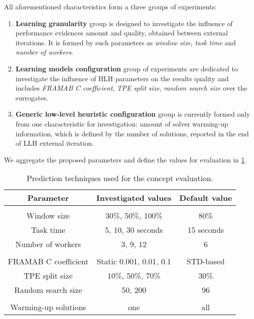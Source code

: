 All aforementioned characteristics form a three groups of experiments:
\begin{enumerate}
	\item \textbf{Learning granularity} group is designed to investigate the influence of performance evidences amount and quality, obtained between external iterations. It is formed by such parameters as \emph{window size}, \emph{task time} and \emph{number of workers}.
	
	\item \textbf{Learning models configuration} group of experiments are dedicated to investigate the influence of HLH parameters on the results quality and includes \emph{FRAMAB C coefficient}, \emph{TPE split size}, \emph{random search size} over the surrogates.
	
	\item \textbf{Generic low-level heuristic configuration} group is currently formed only from one characteristic for investigation: amount of solver warming-up information, which is defined by the number of solutions, reported in the end of LLH external iteration.
\end{enumerate}

We aggregate the proposed parameters and define the values for evaluation in \cref{eval:2: planning table}.

\begin{table}[h!]
	\centering
	\begin{tabular}{ccc}
		\hline
		\textbf{Parameter} & \textbf{Investigated values} & \textbf{Default value} \\
		\hline
		\rowcolor{gray!10}
		\multicolumn{3}{c}{\textit{Learning granularity}} \\
		Window size & 30\%, 50\%, 100\% & 80\% \\
		Task time & 5, 10, 30 seconds & 15 seconds \\
		Number of workers & 3, 9, 12 & 6 \\
		\rowcolor{gray!10}
		\multicolumn{3}{c}{\textit{Learning models configuration}} \\
		FRAMAB C coefficient & Static 0.001, 0.01, 0.1 & STD-based \\
		TPE split size & 10\%, 50\%, 70\% & 30\% \\
		Random search size & 50, 200 & 96 \\
		\rowcolor{gray!10}
		\multicolumn{3}{c}{\textit{Generic LLH configuration}} \\
		Warming-up solutions & one & all \\
		\hline
	\end{tabular}
	\caption{Prediction techniques used for the concept evaluation.}
	\label{eval:2: planning table}
\end{table}

